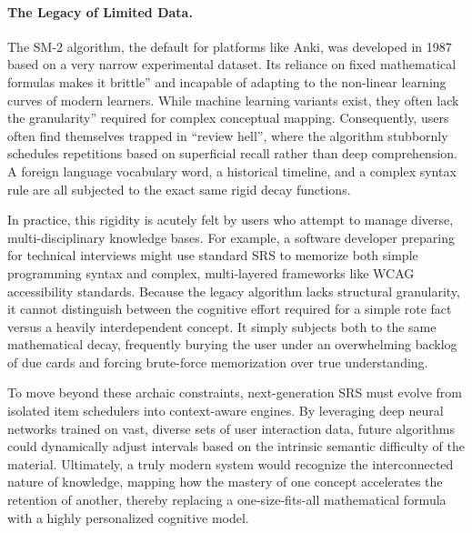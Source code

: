 \paragraph{The Legacy of Limited Data.}
The SM-2 algorithm, the default for platforms like Anki, was developed in 1987 based on a very narrow experimental dataset. Its reliance on fixed mathematical formulas makes it brittle'' and incapable of adapting to the non-linear learning curves of modern learners. While machine learning variants exist, they often lack the granularity'' required for complex conceptual mapping. Consequently, users often find themselves trapped in ``review hell'', where the algorithm stubbornly schedules repetitions based on superficial recall rather than deep comprehension. A foreign language vocabulary word, a historical timeline, and a complex syntax rule are all subjected to the exact same rigid decay functions\cite{anki_sm2_repo}.

In practice, this rigidity is acutely felt by users who attempt to manage diverse, multi-disciplinary knowledge bases. For example, a software developer preparing for technical interviews might use standard SRS to memorize both simple programming syntax and complex, multi-layered frameworks like WCAG accessibility standards. Because the legacy algorithm lacks structural granularity, it cannot distinguish between the cognitive effort required for a simple rote fact versus a heavily interdependent concept. It simply subjects both to the same mathematical decay, frequently burying the user under an overwhelming backlog of due cards and forcing brute-force memorization over true understanding.

To move beyond these archaic constraints, next-generation SRS must evolve from isolated item schedulers into context-aware engines. By leveraging deep neural networks trained on vast, diverse sets of user interaction data, future algorithms could dynamically adjust intervals based on the intrinsic semantic difficulty of the material. Ultimately, a truly modern system would recognize the interconnected nature of knowledge, mapping how the mastery of one concept accelerates the retention of another, thereby replacing a one-size-fits-all mathematical formula with a highly personalized cognitive model.

